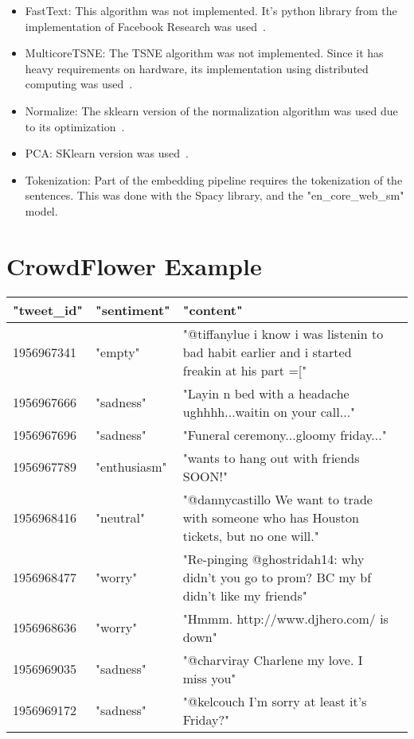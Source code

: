 \begin{itemize}
  \item FastText: This algorithm was not implemented. It's python library from the implementation of Facebook Research was used~\cite{joulin2017fasttext}. %

  \item MulticoreTSNE: The TSNE algorithm was not implemented. Since it has heavy requirements on hardware, its implementation using distributed computing was used~\cite{ulyanov2016tsne}.
  \item Normalize: The sklearn version of the normalization algorithm was used due to its optimization~\cite{sklearn}.
  \item PCA: SKlearn version was used~\cite{sklearn}.
  \item Tokenization: Part of the embedding pipeline requires the tokenization of the sentences. This was done with the Spacy library, and the "en_core_web_sm" model.\cite{spacy}
\end{itemize}

\section{CrowdFlower Example}\label{sec:CrowdFlower_example}

\begin{landscape}
  \begin{table}
      \centering
      \begin{tabular}{|l|l|l|l}
      \hline
          "tweet_id" & "sentiment" & "content" \\ \hline

          1956967341 & "empty" & "@tiffanylue i know  i was listenin to bad habit earlier and i started freakin at his part =[" \\
          1956967666 & "sadness" & "Layin n bed with a headache  ughhhh...waitin on your call..." \\
          1956967696 & "sadness" & "Funeral ceremony...gloomy friday..." \\
          1956967789 & "enthusiasm" & "wants to hang out with friends SOON!" \\
          1956968416 & "neutral" & "@dannycastillo We want to trade with someone who has Houston tickets, but no one will." \\
          1956968477 & "worry" & "Re-pinging @ghostridah14: why didn't you go to prom? BC my bf didn't like my friends" \\
          1956968636 & "worry" & "Hmmm. http://www.djhero.com/ is down" \\
          1956969035 & "sadness" & "@charviray Charlene my love. I miss you" \\
          1956969172 & "sadness" & "@kelcouch I'm sorry  at least it's Friday?" \\
          \hline
      \end{tabular}
  \end{table}
\end{landscape}



